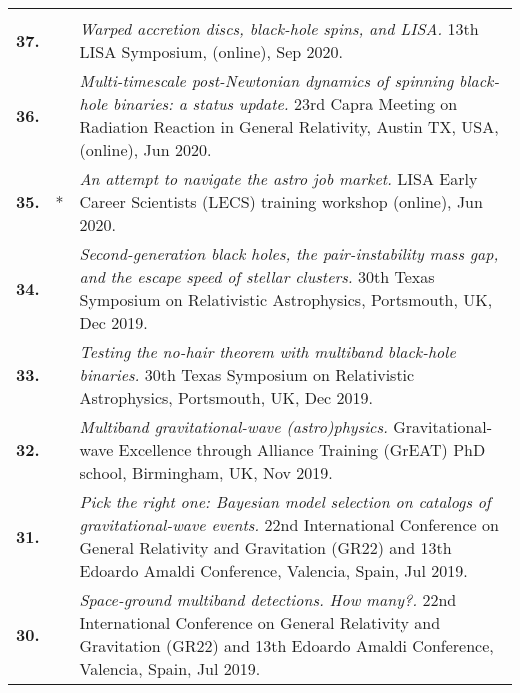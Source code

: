 {\begin{longtable}{rp{0.3cm}p{15.8cm}}
\vspace{0.05cm}\\
%
\textbf{37.} &  & \textit{Warped accretion discs, black-hole spins, and LISA.}
\newline{}
13th LISA Symposium, (online), Sep 2020.
\vspace{0.05cm}\\
%
\textbf{36.} &  & \textit{Multi-timescale post-Newtonian dynamics of spinning black-hole binaries: a status update.}
\newline{}
23rd Capra Meeting on Radiation Reaction in General Relativity, Austin TX, USA, (online), Jun 2020.
\vspace{0.05cm}\\
%
\textbf{35.} & * & \textit{An attempt to navigate the astro job market.}
\newline{}
LISA Early Career Scientists (LECS) training workshop (online), Jun 2020.
\vspace{0.05cm}\\
%
\textbf{34.} &  & \textit{Second-generation black holes, the pair-instability mass gap, and the escape speed of stellar clusters.}
\newline{}
30th Texas Symposium on Relativistic Astrophysics, Portsmouth, UK, Dec 2019.
\vspace{0.05cm}\\
%
\textbf{33.} &  & \textit{Testing the no-hair theorem with multiband black-hole binaries.}
\newline{}
30th Texas Symposium on Relativistic Astrophysics, Portsmouth, UK, Dec 2019.
\vspace{0.05cm}\\
%
\textbf{32.} &  & \textit{Multiband gravitational-wave (astro)physics.}
\newline{}
 Gravitational-wave Excellence through Alliance Training (GrEAT) PhD school, Birmingham, UK, Nov 2019.
\vspace{0.05cm}\\
%
\textbf{31.} &  & \textit{Pick the right one: Bayesian model selection on catalogs of gravitational-wave events.}
\newline{}
 22nd International Conference on General Relativity and Gravitation (GR22) and 13th Edoardo Amaldi Conference, Valencia, Spain, Jul 2019.
\vspace{0.05cm}\\
%
\textbf{30.} &  & \textit{Space-ground multiband detections. How many?.}
\newline{}
 22nd International Conference on General Relativity and Gravitation (GR22) and 13th Edoardo Amaldi Conference, Valencia, Spain, Jul 2019.

\end{longtable}}
